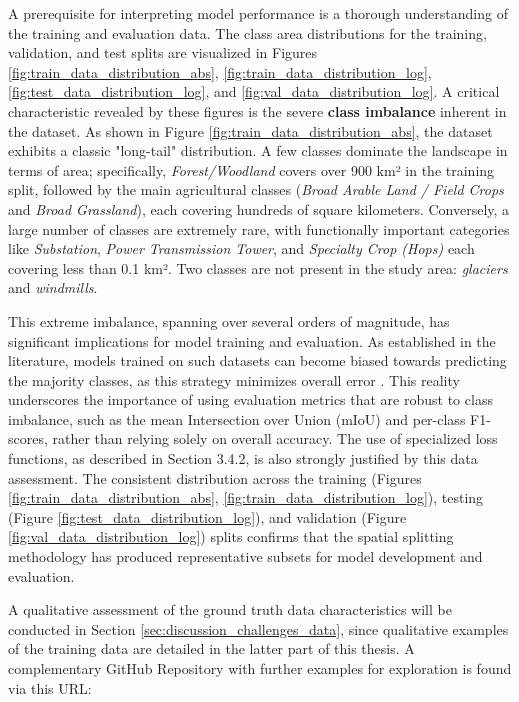 \documentclass{report}
\begin{document}
A prerequisite for interpreting model performance is a thorough understanding of the training and evaluation data. The class area distributions for the training, validation, and test splits are visualized in Figures  \ref{fig:train_data_distribution_abs}, \ref{fig:train_data_distribution_log}, \ref{fig:test_data_distribution_log}, and \ref{fig:val_data_distribution_log}.
A critical characteristic revealed by these figures is the severe \textbf{class imbalance} inherent in the dataset. As shown in Figure \ref{fig:train_data_distribution_abs}, the dataset exhibits a classic "long-tail" distribution. A few classes dominate the landscape in terms of area; specifically, \textit{Forest/Woodland} covers over 900 km² in the training split, followed by the main agricultural classes (\textit{Broad Arable Land / Field Crops} and \textit{Broad Grassland}), each covering hundreds of square kilometers. Conversely, a large number of classes are extremely rare, with functionally important categories like \textit{Substation}, \textit{Power Transmission Tower}, and \textit{Specialty Crop (Hops)} each covering less than 0.1 km². Two classes are not present in the study area: \textit{glaciers} and \textit{windmills}. \par
This extreme imbalance, spanning over several orders of magnitude, has significant implications for model training and evaluation. As established in the literature, models trained on such datasets can become biased towards predicting the majority classes, as this strategy minimizes overall error \parencite [p.~4f.]{QinLiuReviewLandcoverClassificationVeryHighResolutionRemotelySensedOpticalImagesAnalysisUnitModelScalabilityTransferability2022}. This reality underscores the importance of using evaluation metrics that are robust to class imbalance, such as the mean Intersection over Union (mIoU) and per-class F1-scores, rather than relying solely on overall accuracy. The use of specialized loss functions, as described in Section 3.4.2, is also strongly justified by this data assessment. The consistent distribution across the training (Figures \ref{fig:train_data_distribution_abs}, \ref{fig:train_data_distribution_log}), testing (Figure \ref{fig:test_data_distribution_log}), and validation (Figure \ref{fig:val_data_distribution_log}) splits confirms that the spatial splitting methodology has produced representative subsets for model development and evaluation. \par
A qualitative assessment of the ground truth data characteristics will be conducted in Section \ref{sec:discussion_challenges_data}, since qualitative examples of the training data are detailed in the latter part of this thesis. A complementary GitHub Repository with further examples for exploration is found via this URL:
\end{document}

